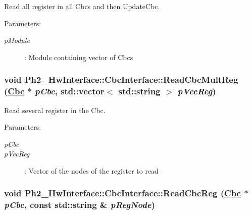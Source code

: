 Read all register in all Cbcs and then Update\-Cbc. 

\begin{Desc}
\item[Parameters:]
\begin{description}
\item[{\em p\-Module}]: Module containing vector of Cbcs \end{description}
\end{Desc}
\hypertarget{class_ph2___hw_interface_1_1_cbc_interface_74baf6bc4fb08739c1477de0b75de9c9}{
\subsubsection[ReadCbcMultReg]{\setlength{\rightskip}{0pt plus 5cm}void Ph2\_\-Hw\-Interface::Cbc\-Interface::Read\-Cbc\-Mult\-Reg (\hyperlink{class_ph2___hw_description_1_1_cbc}{Cbc} $\ast$ {\em p\-Cbc}, std::vector$<$ std::string $>$ {\em p\-Vec\-Reg})}}
\label{class_ph2___hw_interface_1_1_cbc_interface_74baf6bc4fb08739c1477de0b75de9c9}


Read several register in the Cbc. 

\begin{Desc}
\item[Parameters:]
\begin{description}
\item[{\em p\-Cbc}]\item[{\em p\-Vec\-Reg}]: Vector of the nodes of the register to read \end{description}
\end{Desc}
\hypertarget{class_ph2___hw_interface_1_1_cbc_interface_a879b96566ef29a56b606f6cb65c8656}{
\subsubsection[ReadCbcReg]{\setlength{\rightskip}{0pt plus 5cm}void Ph2\_\-Hw\-Interface::Cbc\-Interface::Read\-Cbc\-Reg (\hyperlink{class_ph2___hw_description_1_1_cbc}{Cbc} $\ast$ {\em p\-Cbc}, const std::string \& {\em p\-Reg\-Node})}}
\label{class_ph2___hw_interface_1_1_cbc_interface_a879b96566ef29a56b606f6cb65c8656}


